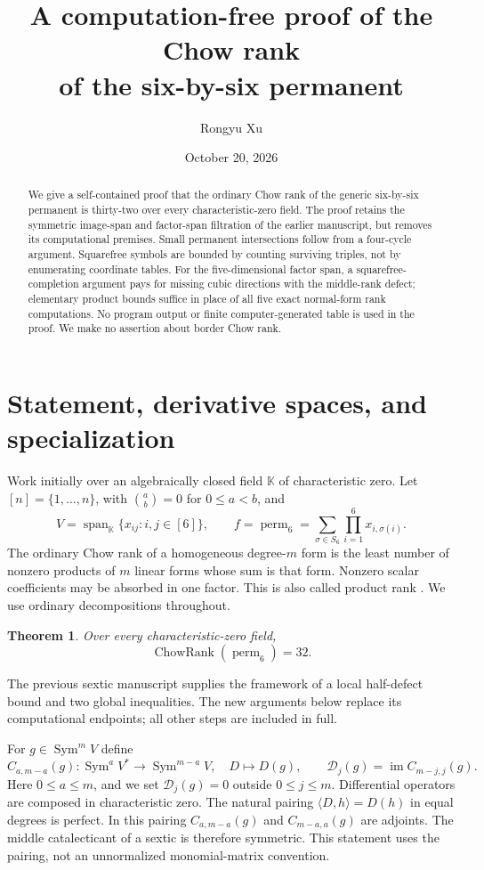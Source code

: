 \documentclass[11pt]{amsart}
\title[A computation-free proof for the six-by-six permanent]{A computation-free proof of the Chow rank\\of the six-by-six permanent}
\author{Rongyu Xu}
\date{October 20, 2026}
\newtheorem{theorem}{Theorem}[section]
\theoremstyle{remark}\newtheorem{remark}[theorem]{Remark}
\numberwithin{equation}{section}
\newcommand{\K}{\mathbb K}
\newcommand{\Sym}{\operatorname{Sym}}
\newcommand{\Span}{\operatorname{span}}
\newcommand{\im}{\operatorname{im}}
\newcommand{\perm}{\operatorname{perm}}
\newcommand{\CR}{\operatorname{ChowRank}}
\newcommand{\cD}{\mathcal D}
\begin{document}
\begin{abstract}
We give a self-contained proof that the ordinary Chow rank of the generic
six-by-six permanent is thirty-two over every characteristic-zero field.
The proof retains the symmetric image-span and factor-span filtration of the
earlier manuscript, but removes its computational premises. Small permanent
intersections follow from a four-cycle argument. Squarefree symbols are
bounded by counting surviving triples, not by enumerating coordinate tables.
For the five-dimensional factor span, a squarefree-completion argument pays
for missing cubic directions with the middle-rank defect; elementary product
bounds suffice in place of all five exact normal-form rank computations.
No program output or finite computer-generated table is used in the proof.
We make no assertion about border Chow rank.
\end{abstract}
\maketitle

\section{Statement, derivative spaces, and specialization}
Work initially over an algebraically closed field $\K$ of characteristic
zero. Let $[n]=\{1,\ldots,n\}$, with $\binom ab=0$ for $0\le a<b$, and
\[
 V=\Span_\K\{x_{ij}:i,j\in[6]\},\qquad
 f=\perm_6=\sum_{\sigma\in S_6}\prod_{i=1}^6x_{i,\sigma(i)}.
\]
The ordinary Chow rank of a homogeneous degree-$m$ form is the least number
of nonzero products of $m$ linear forms whose sum is that form. Nonzero scalar
coefficients may be absorbed in one factor. This is also called product
rank \cite{IltenTeitler}. We use ordinary decompositions throughout.
\begin{theorem}\label{thm:main}
Over every characteristic-zero field,
\[
 \CR(\perm_6)=32.
\]
\end{theorem}
The previous sextic manuscript \cite{previous} supplies the framework of a
local half-defect bound and two global inequalities. The new arguments below
replace its computational endpoints; all other steps are included in full.

For $g\in\Sym^m V$ define
\[
 C_{a,m-a}(g):\Sym^a V^*\longrightarrow\Sym^{m-a}V,
 \quad D\longmapsto D(g),\qquad
 \cD_j(g)=\im C_{m-j,j}(g).
\]
Here $0\le a\le m$, and we set $\cD_j(g)=0$ outside $0\le j\le m$.
Differential operators are composed in characteristic zero. The natural
pairing $\langle D,h\rangle=D(h)$ in equal degrees is perfect. In this
pairing $C_{a,m-a}(g)$ and $C_{m-a,a}(g)$ are adjoints. The middle
catalecticant of a sextic is therefore symmetric. This statement uses the
pairing, not an unnormalized monomial-matrix convention.
\end{document}
